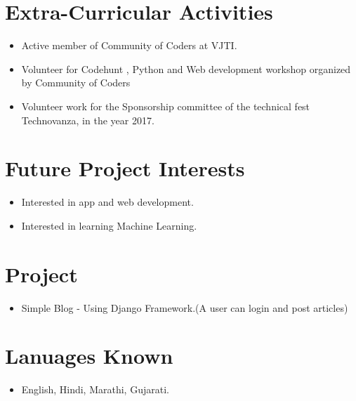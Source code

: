 \documentclass[letterpaper]{twentysecondcv} %
\begin{document}
\section{Extra-Curricular Activities}
\begin{itemize}
    \item Active member of Community of Coders at VJTI.
    \item Volunteer for Codehunt , Python and Web development workshop organized by Community of Coders
    \item Volunteer work for the Sponsorship committee of the technical fest Technovanza, in the year 2017.\\
\end{itemize}

\section{Future Project Interests}
\begin{itemize}
    \item Interested in app and web development.
    \item Interested in learning Machine Learning.\\
\end{itemize}

\section{Project}
\begin{itemize}
    \item Simple Blog - Using Django Framework.(A user can login and post articles)\\
\end{itemize}

\section{Lanuages Known}
\begin{itemize}
    \item English, Hindi, Marathi, Gujarati.
\end{itemize}
\end{document}
